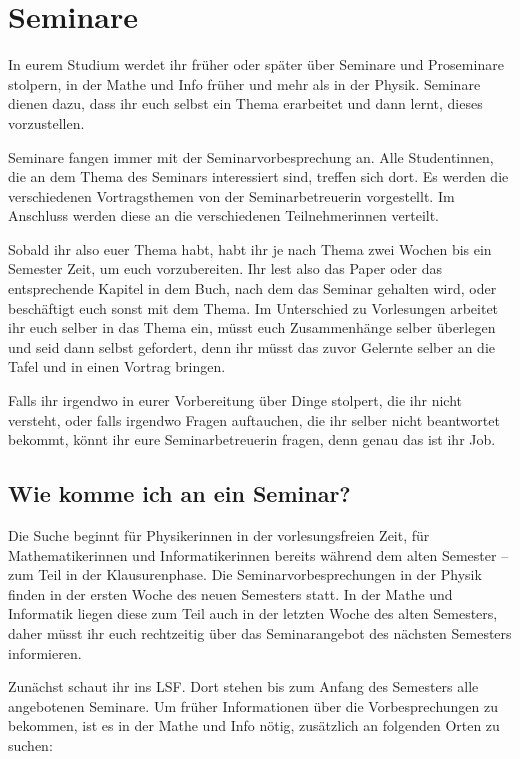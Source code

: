 \section{Seminare}

In eurem Studium werdet ihr früher oder später über Seminare und Proseminare stolpern, in der Mathe und Info früher und mehr als in der Physik. Seminare dienen dazu, dass ihr euch selbst ein Thema erarbeitet und dann lernt, dieses vorzustellen.

Seminare fangen immer mit der Seminarvorbesprechung an. Alle Studentinnen, die an dem Thema des Seminars interessiert sind, treffen sich dort. Es werden die verschiedenen Vortragsthemen von der Seminarbetreuerin vorgestellt. Im Anschluss werden diese an die verschiedenen Teilnehmerinnen verteilt.

Sobald ihr also euer Thema habt, habt ihr je nach Thema zwei Wochen bis ein Semester Zeit, um euch vorzubereiten. Ihr lest also das Paper oder das entsprechende Kapitel in dem Buch, nach dem das Seminar gehalten wird, oder beschäftigt euch sonst mit dem Thema. Im Unterschied zu Vorlesungen arbeitet ihr euch selber in das Thema ein, müsst euch Zusammenhänge selber überlegen und seid dann selbst gefordert, denn ihr müsst das zuvor Gelernte selber an die Tafel und in einen Vortrag bringen.

Falls ihr irgendwo in eurer Vorbereitung über Dinge stolpert, die ihr nicht versteht, oder falls irgendwo Fragen auftauchen, die ihr selber nicht beantwortet bekommt, könnt ihr eure Seminarbetreuerin fragen, denn genau das ist ihr Job.

\subsection{Wie komme ich an ein Seminar?}

Die Suche beginnt für Physikerinnen in der vorlesungsfreien Zeit, für Mathematikerinnen und Informatikerinnen bereits während dem alten Semester -- zum Teil in der Klausurenphase. Die Seminarvorbesprechungen in der Physik finden in der ersten Woche des neuen Semesters statt. In der Mathe und Informatik liegen diese zum Teil auch in der letzten Woche des alten Semesters, daher müsst ihr euch rechtzeitig über das Seminarangebot des nächsten Semesters informieren.

Zunächst schaut ihr ins LSF. Dort stehen bis zum Anfang des Semesters alle angebotenen Seminare. Um früher Informationen über die Vorbesprechungen zu bekommen, ist es in der Mathe und Info nötig, zusätzlich an folgenden Orten zu suchen:

